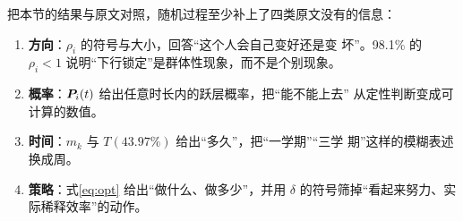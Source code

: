 把本节的结果与原文对照，随机过程至少补上了四类原文没有的信息：

\begin{enumerate}[label=（\arabic*）,itemsep=2pt,topsep=2pt,leftmargin=3em]
\item \textbf{方向}：$\rho_i$ 的符号与大小，回答“这个人会自己变好还是变
  坏”。98.1\% 的 $\rho_i<1$ 说明“下行锁定”是群体性现象，而不是个别现象。
\item \textbf{概率}：$\bm{P}_i(t)$ 给出任意时长内的跃层概率，把“能不能上去”
  从定性判断变成可计算的数值。
\item \textbf{时间}：$m_k$ 与 $T(43.97\%)$ 给出“多久”，把“一学期”“三学
  期”这样的模糊表述换成周。
\item \textbf{策略}：式\eqref{eq:opt} 给出“做什么、做多少”，并用 $\delta$
  的符号筛掉“看起来努力、实际稀释效率”的动作。
\end{enumerate}







